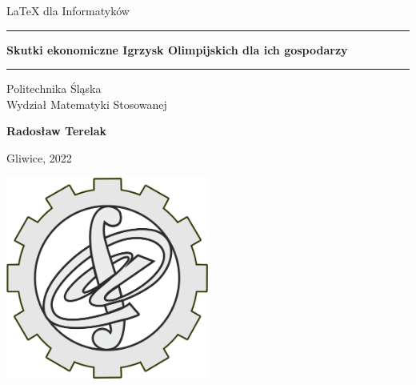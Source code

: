 \documentclass[12pt]{article}
\newcommand{\mytitle}{Skutki ekonomiczne Igrzysk Olimpijskich dla ich gospodarzy}
\newcommand{\myname}{Radosław Terelak}
\begin{document}
 
\begin{titlepage}
\begin{center}
    
\LARGE
LaTeX dla Informatyków
    
\vspace{0.5cm}
      
\rule{\textwidth}{1.5pt}
\LARGE
\textbf{\mytitle}
\rule{\textwidth}{1.5pt}
   
\vspace{0.5cm}
      
\large
Politechnika Śląska\\
Wydział Matematyki Stosowanej

\vfill

\Large
\textbf{\myname}

\vfill

\large
Gliwice, 2022
      
\vfill

\includegraphics[width = 0.5\textwidth]{img/logoMS}

\vfill

\end{center}
\end{titlepage}


\newpage
\tableofcontents
\begin{abstract}
   W niniejszym artykule przeanalizowano wpływ organizacji Igrzysk Olimpijskich na gospodarkę regionalną w krótkim i długim okresie. W celu identyfikacji, zdobywcy drugiego miejsca w olimpijskim procesie przetargowym są wykorzystywani do konstruowania scenariusza alternatywnego dla regionów-gospodarzy igrzysk. W krótkim okresie organizacja letnich Igrzysk Olimpijskich zwiększa regionalny PKB na mieszkańca o około 3 do 4 punktów procentowych w stosunku do poziomu krajowego w roku imprezy i rok wcześniej. Istnieją również dowody na pozytywne skutki długoterminowe, ale wyniki dotyczące tych ostatnich nie są statystycznie pewne. Z kolei zimowe igrzyska olimpijskie nie mają pozytywnego wpływu na regiony goszczące. Prowadzą one do czasowego spadku regionalnego PKB na mieszkańca w latach poprzedzających to wydarzenie.
\end{abstract}
\end{document}
